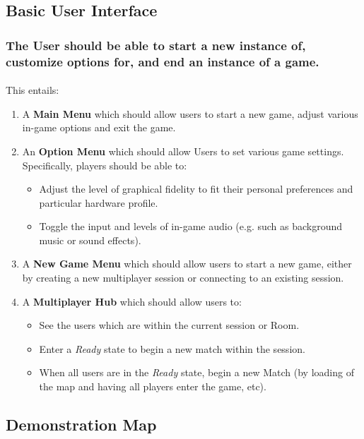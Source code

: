 \documentclass{article}
\begin{document}
\subsection{Basic User Interface}
\subsubsection{\textbf{The User should be able to start a new instance of, customize options for, and end an instance of a game.}}
\paragraph{}This entails:

\begin{enumerate}
  \item A \textbf{Main Menu} which should allow users to start a new game, adjust various in-game options and exit the game.
  \item An \textbf{Option Menu} which should allow Users to set various game settings. Specifically, players should be able to:
  
  \begin{itemize}
      \item Adjust the level of graphical fidelity to fit their personal preferences and particular hardware profile.
      \item Toggle the input and levels of in-game audio (e.g. such as background music or sound effects).
  \end{itemize}
  
 \item A \textbf{New Game Menu} which should allow users to start a new game, either by creating a new multiplayer session or connecting to an existing session.
 \item A \textbf{Multiplayer Hub} which should allow users to:
 
  \begin{itemize}
      \item See the users which are within the current session or Room.
      \item Enter a \textit{Ready} state to begin a new match within the session.
      \item When all users are in the \textit{Ready} state, begin a new Match (by loading of the map and having all players enter the game, etc).
  \end{itemize}
\end{enumerate}

\subsection{Demonstration Map}
\end{document}
